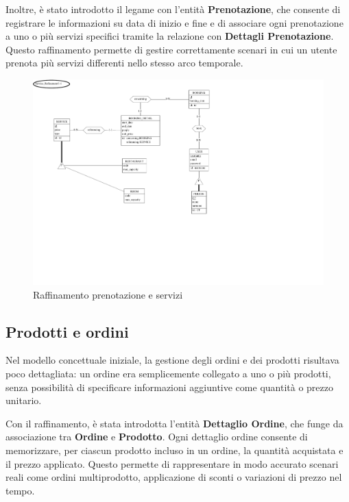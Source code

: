 \documentclass[a4paper,12pt]{report}
\begin{document}
\vspace{\baselineskip}
Inoltre, è stato introdotto il legame con l'entità
\textbf{Prenotazione}, che consente di registrare le informazioni su
data di inizio e fine e di associare ogni prenotazione a uno o più
servizi specifici tramite la relazione con \textbf{Dettagli
Prenotazione}. Questo raffinamento permette di gestire correttamente
scenari in cui un utente prenota più servizi differenti nello stesso
arco temporale.

\begin{figure}[H]
  \centering
  \includegraphics[width=\textwidth, trim=0 200pt 300pt 0,
  clip]{./schemas/refinements/service.pdf}
  \caption{Raffinamento prenotazione e servizi}
  \label{fig:raffinamento-servizi-prenotazione}
\end{figure}

\newpage
\subsection{Prodotti e ordini}
Nel modello concettuale iniziale, la gestione degli ordini e dei
prodotti risultava poco dettagliata: un ordine era semplicemente
collegato a uno o più prodotti, senza possibilità di specificare
informazioni aggiuntive come quantità o prezzo unitario.

\vspace{\baselineskip}
Con il raffinamento, è stata introdotta l'entità \textbf{Dettaglio
Ordine}, che funge da associazione tra \textbf{Ordine} e
\textbf{Prodotto}. Ogni dettaglio ordine consente di memorizzare, per
ciascun prodotto incluso in un ordine, la quantità acquistata e il
prezzo applicato. Questo permette di rappresentare in modo accurato
scenari reali come ordini multiprodotto, applicazione di sconti o
variazioni di prezzo nel tempo.
\end{document}
